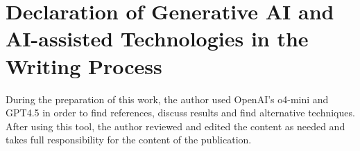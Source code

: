 \chapter*{Declaration of Generative AI and AI-assisted Technologies in the 
Writing Process}

During the preparation of this work, the author used OpenAI's o4-mini and GPT4.5 in order to find references, discuss results and find alternative techniques. 
After using this tool, the author reviewed and edited the content as needed and takes full 
responsibility for the content of the publication.
